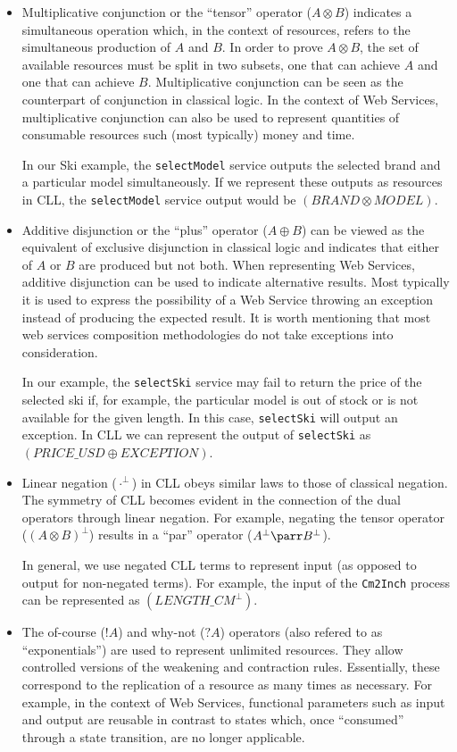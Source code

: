 \documentclass[copyright,creativecommons]{eptcs}
\begin{document}
\begin{itemize}

\item Multiplicative conjunction or the ``tensor'' operator ($A \otimes B$) indicates a simultaneous operation which, in the context of resources, refers to the simultaneous production of $A$ and $B$. In order to prove $A \otimes B$, the set of available resources must be split in two subsets, one that can achieve $A$ and one that can achieve $B$. Multiplicative conjunction can be seen as the counterpart of conjunction in classical logic. In the context of Web Services, multiplicative conjunction can also be used to represent quantities of consumable resources such (most typically) money and time. 

In our Ski example, the \texttt{selectModel} service outputs the selected brand and a particular model simultaneously. If we represent these outputs as resources in CLL, the \texttt{selectModel} service output would be $(BRAND\otimes MODEL)$.

\item Additive disjunction or the ``plus'' operator ($A \oplus B$) can be viewed as the equivalent of exclusive disjunction in classical logic and indicates that either of $A$ or $B$ are produced but not both. When representing Web Services, additive disjunction can be used to indicate alternative results. Most typically it is used to express the possibility of a Web Service throwing an exception instead of producing the expected result. It is worth mentioning that most web services composition methodologies do not take exceptions into consideration.


In our example, the \texttt{selectSki} service may fail to return the price of the selected ski if, for example, the particular model is out of stock or is not available for the given length. In this case, \texttt{selectSki} will output an exception. In CLL we can represent the output of \texttt{selectSki} as $(PRICE\_USD\oplus EXCEPTION)$.

\item Linear negation ($\cdot ^\bot$) in CLL obeys similar laws to those of classical negation. The symmetry of CLL becomes evident in the connection of the dual operators through linear negation. For example, negating the tensor operator ($(A \otimes B)^\bot$) results in a ``par'' operator ($A^\bot \parr B^\bot$).

In general, we use negated CLL terms to represent input (as opposed to output for non-negated terms). For example, the input of the \texttt{Cm2Inch} process can be represented as $(LENGTH\_CM^\bot)$.

\item The of-course ($!A$) and why-not ($?A$) operators (also refered to as ``exponentials'') are used to represent unlimited resources. They allow controlled versions of the weakening and contraction rules. Essentially, these correspond to the replication of a resource as many times as necessary. For example, in the context of Web Services, functional parameters such as input and output are reusable in contrast to states which, once ``consumed'' through a state transition, are no longer applicable. 
\end{itemize}
\end{document}
